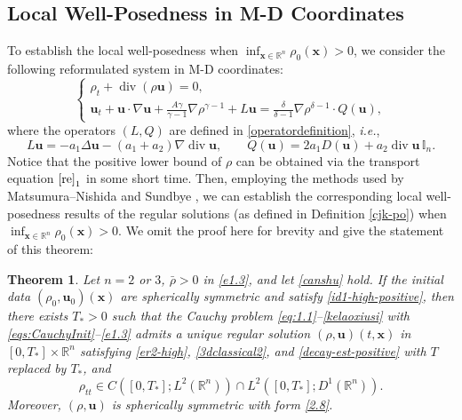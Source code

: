 \documentclass[11pt,reqno]{amsart}
\DeclareMathOperator{\diver}{\mathrm{div}}
\newtheorem{thm}{Theorem}[section]
\numberwithin{rk}{section}
\numberwithin{prop}{section}
\numberwithin{mydef}{section}
\numberwithin{lem}{section}
\numberwithin{equation}{section}
\numberwithin{thm}{section}
\begin{document}
\subsection{Local Well-Posedness in M-D Coordinates} 
To establish the local well-posedness when $\inf_{\boldsymbol{x}\in \mathbb{R}^n} \rho_0(\boldsymbol{x})>0$, we consider the following reformulated system in M-D coordinates: 
\begin{equation}\label{re}
\begin{cases}
\rho_t+\diver(\rho\boldsymbol{u})=0,\\[3pt]
\displaystyle\boldsymbol{u}_t+\boldsymbol{u}\cdot\nabla\boldsymbol{u}+\frac{A\gamma}{\gamma-1} \nabla\rho^{\gamma-1}+L\boldsymbol{u}=\frac{\delta}{\delta-1}\nabla \rho^{\delta-1} \cdot Q(\boldsymbol{u}),
\end{cases}
\end{equation}
where the operators $(L,Q)$ are defined in \eqref{operatordefinition}, \textit{i.e.},
\begin{equation*}
L\boldsymbol{u}=-a_1\Delta\boldsymbol{u}-(a_1+a_2)\nabla\diver \boldsymbol{u},\qquad Q(\boldsymbol{u})=2a_1 D(\boldsymbol{u})+a_2\diver\boldsymbol{u}\,\mathbb{I}_n.
\end{equation*}
Notice that the positive lower bound of $\rho$ can be obtained via the transport 
equation $\eqref{re}_1$ in some short time. Then, employing the methods used by Matsumura--Nishida \cite{MN} and Sundbye \cite{Sundbye2}, we can establish the corresponding local well-posedness results of the regular solutions (as defined in Definition \ref{cjk-po}) when $\inf_{\boldsymbol{x}\in \mathbb{R}^n} \rho_0(\boldsymbol{x})>0$. 
We omit the proof here for brevity and give the statement of this theorem:



\begin{thm}\label{zth2-po}
Let $n=2$ or $3$, $\bar\rho>0$ in \eqref{e1.3}, and let \eqref{canshu} hold. If the initial data $(\rho_0, \boldsymbol{u}_0)(\boldsymbol{x})$ are spherically symmetric and satisfy \eqref{id1-high-positive}, then there exists $T_*>0$ such that the Cauchy problem \eqref{eq:1.1}--\eqref{kelaoxiusi} with \eqref{eqs:CauchyInit}--\eqref{e1.3}  admits a unique regular solution $(\rho, \boldsymbol{u})(t, \boldsymbol{x})$ in $[0, T_*] \times \mathbb{R}^n$ satisfying \eqref{er2-high}, \eqref{3dclassical2}, and \eqref{decay-est-positive} with $T$ replaced by $T_*$, and
\begin{equation*}
\rho_{tt} \in C([0, T_*] ; L^2(\mathbb{R}^n)) \cap L^2([0,T_*];D^1(\mathbb{R}^n)).
\end{equation*}
Moreover, $(\rho, \boldsymbol{u})$ is spherically symmetric with form \eqref{2.8}.
\end{thm}
\end{document}
